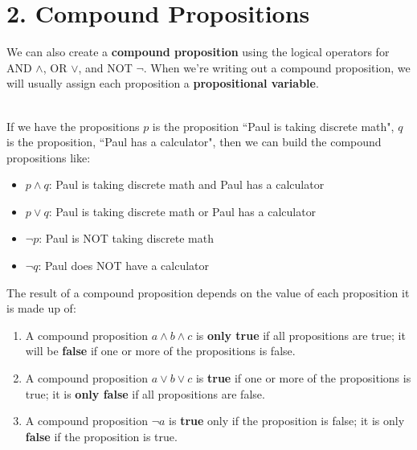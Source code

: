 \documentclass[a4paper,12pt]{book}
\begin{document}
    \newpage
    \section*{2. Compound Propositions}
        \begin{introNOHEAD}
            We can also create a \textbf{compound proposition} using the logical operators
            for AND $\land$, OR $\lor$, and NOT $\neg$. When we're writing out
            a compound proposition, we will usually assign each proposition a
            \textbf{propositional variable}.

            ~\\ If we have the propositions
            $p$ is the proposition ``Paul is taking discrete math",
            $q$ is the proposition, ``Paul has a calculator",
            then we can build the compound propositions like:
            \begin{itemize}
                \item[] $p \land q$: Paul is taking discrete math and Paul has a calculator
                \item[] $p \lor q$: Paul is taking discrete math or Paul has a calculator
                \item[] $\neg p$: Paul is NOT taking discrete math
                \item[] $\neg q$: Paul does NOT have a calculator
            \end{itemize}

            The result of a compound proposition depends on the value of
            each proposition it is made up of:

            \begin{enumerate}
                \item A compound proposition $a \land b \land c$ is \textbf{only true}
                    if all propositions are true; it will be \textbf{false} if
                    one or more of the propositions is false.
                \item A compound proposition $a \lor b \lor c$ is \textbf{true}
                    if one or more of the propositions is true; it is \textbf{only false}
                    if all propositions are false.
                \item A compound proposition $\neg a$ is \textbf{true} only
                    if the proposition is false; it is only \textbf{false} if
                    the proposition is true.
            \end{enumerate}

        \end{introNOHEAD}
\end{document}
